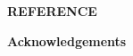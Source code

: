 \documentclass[12pt,a4paper,notitlepage,oneside]{report}
\title{\fontsize{16pt}{22pt}\selectfont\bf\ThesisTitle}
\author{}
\date{}
\begin{document}

\maketitle



\clearpage
\begin{spacing}{1.0}
\tableofcontents
\end{spacing}

\clearpage
{} %



{\def\chapter*#1{}
\clearpage
\begin{center}\fontsize{14pt}{14pt}\selectfont\bf REFERENCE\end{center}
\begin{spacing}{1.5}
\fontsize{12pt}{12pt}\selectfont
{}

\end{spacing}}

{\def\chapter*#1{}
\clearpage
\begin{center}\fontsize{14pt}{14pt}\selectfont\bf Acknowledgements\end{center}
}
\end{document}
